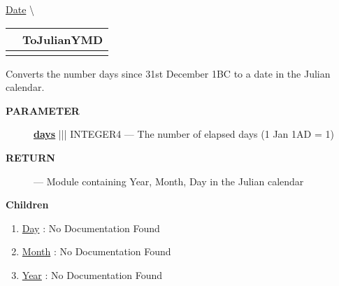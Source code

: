 \hypertarget{ecldoc:date.tojulianymd}{}
\hspace{0pt} \hyperlink{ecldoc:Date}{Date} \textbackslash 

{\renewcommand{\arraystretch}{1.5}
\begin{tabularx}{\textwidth}{|>{\raggedright\arraybackslash}l|X|}
\hline
\hspace{0pt}\mytexttt{\color{red} } & \textbf{ToJulianYMD} \\
\hline
\multicolumn{2}{|>{\raggedright\arraybackslash}X|}{\hspace{0pt}\mytexttt{\color{param} (Days\_t days)}} \\
\hline
\end{tabularx}
}

\par





Converts the number days since 31st December 1BC to a date in the Julian calendar.






\par
\begin{description}
\item [\colorbox{tagtype}{\color{white} \textbf{\textsf{PARAMETER}}}] \textbf{\underline{days}} ||| INTEGER4 --- The number of elapsed days (1 Jan 1AD = 1)
\end{description}







\par
\begin{description}
\item [\colorbox{tagtype}{\color{white} \textbf{\textsf{RETURN}}}] \textbf{} --- Module containing Year, Month, Day in the Julian calendar
\end{description}




\textbf{Children}
\begin{enumerate}
\item \hyperlink{ecldoc:date.tojulianymd.result.day}{Day}
: No Documentation Found
\item \hyperlink{ecldoc:date.tojulianymd.result.month}{Month}
: No Documentation Found
\item \hyperlink{ecldoc:date.tojulianymd.result.year}{Year}
: No Documentation Found
\end{enumerate}

